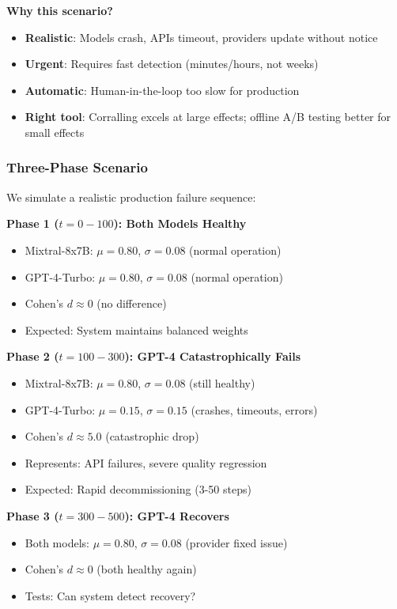 \textbf{Why this scenario?}
\begin{itemize}
    \item \textbf{Realistic}: Models crash, APIs timeout, providers update without notice
    \item \textbf{Urgent}: Requires fast detection (minutes/hours, not weeks)
    \item \textbf{Automatic}: Human-in-the-loop too slow for production
    \item \textbf{Right tool}: Corralling excels at large effects; offline A/B testing better for small effects
\end{itemize}

\subsubsection{Three-Phase Scenario}

We simulate a realistic production failure sequence:

\textbf{Phase 1 ($t=0-100$): Both Models Healthy}
\begin{itemize}
    \item Mixtral-8x7B: $\mu = 0.80$, $\sigma = 0.08$ (normal operation)
    \item GPT-4-Turbo: $\mu = 0.80$, $\sigma = 0.08$ (normal operation)
    \item Cohen's $d \approx 0$ (no difference)
    \item Expected: System maintains balanced weights
\end{itemize}

\textbf{Phase 2 ($t=100-300$): GPT-4 Catastrophically Fails}
\begin{itemize}
    \item Mixtral-8x7B: $\mu = 0.80$, $\sigma = 0.08$ (still healthy)
    \item GPT-4-Turbo: $\mu = 0.15$, $\sigma = 0.15$ (crashes, timeouts, errors)
    \item Cohen's $d \approx 5.0$ (catastrophic drop)
    \item Represents: API failures, severe quality regression
    \item Expected: Rapid decommissioning (3-50 steps)
\end{itemize}

\textbf{Phase 3 ($t=300-500$): GPT-4 Recovers}
\begin{itemize}
    \item Both models: $\mu = 0.80$, $\sigma = 0.08$ (provider fixed issue)
    \item Cohen's $d \approx 0$ (both healthy again)
    \item Tests: Can system detect recovery?
\end{itemize}


